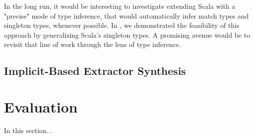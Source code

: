 In the long run, it would be interesting to investigate extending Scala with a "precise" mode of type inference, that would automatically infer match types and singleton types, whenever possible.
In , we demonstrated the feasibility of this approach by generalizing Scala's singleton types.
A promising avenue would be to revisit that line of work through the lens of type inference.

\subsection{Implicit-Based Extractor Synthesis}
\label{subsec:implicit-based-extractor-synthesis}



\section{Evaluation}

In this section...
